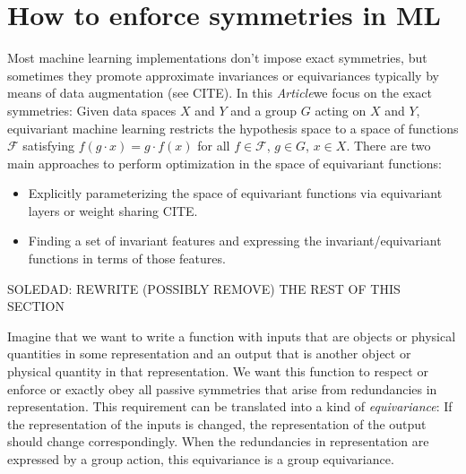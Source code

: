 \documentclass{article}
\theoremstyle{plain}
\theoremstyle{definition}
\theoremstyle{remark}
\newcommand{\documentname}{\textsl{Article}}
\begin{document}
\section{How to enforce symmetries in ML}

Most machine learning implementations don't impose exact symmetries, but sometimes they promote approximate invariances or equivariances typically by means of data augmentation (see CITE). In this \documentname we focus on the exact symmetries: Given data spaces $X$ and $Y$ and a group $G$ acting on $X$ and $Y$, equivariant machine learning restricts the hypothesis space to a space of functions $\mathcal F$ satisfying  $f(g\cdot x) = g \cdot f(x)$ for all $f\in \mathcal F$, $g\in G$, $x\in X$. There are two main approaches to perform optimization in the space of equivariant functions:
\begin{itemize}
    \item Explicitly parameterizing the space of equivariant functions via equivariant layers or weight sharing CITE.
    \item Finding a set of invariant features and expressing the invariant/equivariant functions in terms of those features.
\end{itemize}



SOLEDAD: REWRITE (POSSIBLY REMOVE) THE REST OF THIS SECTION 

Imagine that we want to write a function with inputs that are objects or physical quantities in some representation and an output that is another object or physical quantity in that representation.
We want this function to respect or enforce or exactly obey all passive symmetries that arise from redundancies in representation.
This requirement can be translated into a kind of \emph{equivariance}:
If the representation of the inputs is changed, the representation of the output should change correspondingly.
When the redundancies in representation are expressed by a group action, this equivariance is a group equivariance.
\end{document}
